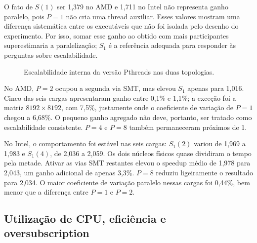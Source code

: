 \documentclass[12pt,a4paper]{article}
\begin{document}
O fato de $S(1)$ ser 1,379 no AMD e 1,711 no Intel não representa ganho
paralelo, pois $P=1$ não cria uma thread auxiliar. Esses valores mostram uma
diferença sistemática entre os executáveis que não foi isolada pelo desenho do
experimento. Por isso, somar esse ganho ao obtido com mais participantes
superestimaria a paralelização; $S_1$ é a referência adequada para responder às
perguntas sobre escalabilidade.

\begin{figure}[htbp]
\centering
{}
\caption{Escalabilidade interna da versão Pthreads nas duas topologias.}
\label{fig:escalabilidade_runners}
\end{figure}

No AMD, $P=2$ ocupou a segunda via SMT, mas elevou $S_1$ apenas para 1,016.
Cinco das seis cargas apresentaram ganho entre 0,1\% e 1,1\%; a exceção foi a
matriz $8192\times8192$, com 7,5\%, justamente onde o coeficiente de variação
de $P=1$ chegou a 6,68\%. O pequeno ganho agregado não deve, portanto, ser
tratado como escalabilidade consistente. $P=4$ e $P=8$ também permaneceram
próximos de 1.

No Intel, o comportamento foi estável nas seis cargas: $S_1(2)$ variou de 1,969
a 1,983 e $S_1(4)$, de 2,036 a 2,059. Os dois núcleos físicos quase dividiram o
tempo pela metade. Ativar as vias SMT restantes elevou o speedup médio de 1,978
para 2,043, um ganho adicional de apenas 3,3\%. $P=8$ reduziu ligeiramente o
resultado para 2,034. O maior coeficiente de variação paralelo nessas cargas foi
0,44\%, bem menor que a diferença entre $P=1$ e $P=2$.

\subsection{Utilização de CPU, eficiência e oversubscription}
\end{document}
